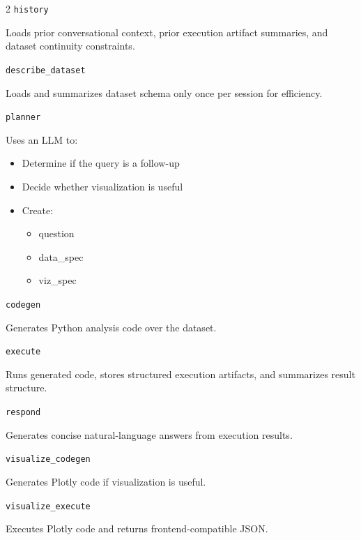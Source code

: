 \documentclass[12pt, oneside]{report}
\begin{document}
\begin{multicols}{2}
    \texttt{history}

    Loads prior conversational context, prior execution artifact summaries,
    and dataset continuity constraints.

    \texttt{describe\_dataset}

    Loads and summarizes dataset schema only once per session for efficiency.

    \texttt{planner}

    Uses an LLM to:

    \begin{itemize}
        \item Determine if the query is a follow-up
        \item Decide whether visualization is useful
        \item
        Create:
        \begin{itemize}
            \item question
            \item data\_spec
            \item viz\_spec
        \end{itemize}
    \end{itemize}

    \vspace*{\fill}\columnbreak

    \texttt{codegen}

    Generates Python analysis code over the dataset.

    \texttt{execute}

    Runs generated code, stores structured execution artifacts, and summarizes result structure.

    \texttt{respond}

    Generates concise natural-language answers from execution results.

    \texttt{visualize\_codegen}

    Generates Plotly code if visualization is useful.

    \texttt{visualize\_execute}

    Executes Plotly code and returns frontend-compatible JSON.

    \vspace*{\fill}
\end{multicols}


\end{document}

